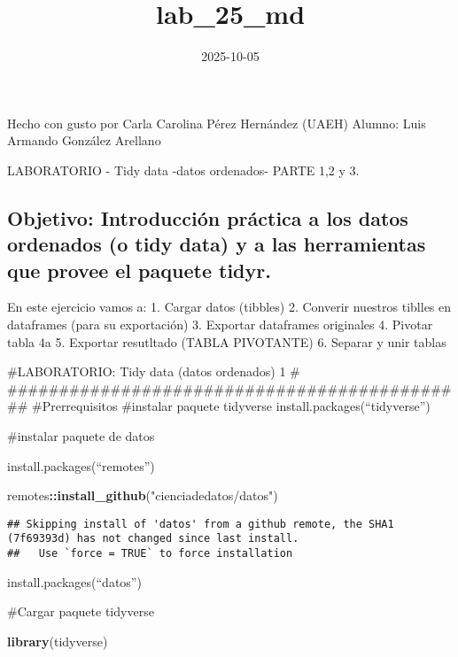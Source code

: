 \documentclass[
]{article}
\title{lab\_25\_md}
\author{}
\date{\vspace{-2.5em}2025-10-05}
\newenvironment{Shaded}{\begin{snugshade}}{\end{snugshade}}
\newcommand{\FunctionTok}[1]{\textcolor[rgb]{0.13,0.29,0.53}{\textbf{#1}}}
\newcommand{\NormalTok}[1]{#1}
\newcommand{\SpecialCharTok}[1]{\textcolor[rgb]{0.81,0.36,0.00}{\textbf{#1}}}
\newcommand{\StringTok}[1]{\textcolor[rgb]{0.31,0.60,0.02}{#1}}
\begin{document}
\maketitle

Hecho con gusto por Carla Carolina Pérez Hernández (UAEH) Alumno: Luis
Armando González Arellano

LABORATORIO - Tidy data -datos ordenados- PARTE 1,2 y 3.

\subsection{Objetivo: Introducción práctica a los datos ordenados (o
tidy data) y a las herramientas que provee el paquete
tidyr.}\label{objetivo-introducciuxf3n-pruxe1ctica-a-los-datos-ordenados-o-tidy-data-y-a-las-herramientas-que-provee-el-paquete-tidyr.}

En este ejercicio vamos a: 1. Cargar datos (tibbles) 2. Converir
nuestros tiblles en dataframes (para su exportación) 3. Exportar
dataframes originales 4. Pivotar tabla 4a 5. Exportar resutltado (TABLA
PIVOTANTE) 6. Separar y unir tablas

\#LABORATORIO: Tidy data (datos ordenados) 1 \#
\#\#\#\#\#\#\#\#\#\#\#\#\#\#\#\#\#\#\#\#\#\#\#\#\#\#\#\#\#\#\#\#\#\#\#\#\#\#\#\#\#\#\#\#\#
\#Prerrequisitos \#instalar paquete tidyverse
install.packages(``tidyverse'')

\#instalar paquete de datos

install.packages(``remotes'')

\begin{Shaded}
\begin{Highlighting}[]
\NormalTok{remotes}\SpecialCharTok{::}\FunctionTok{install\_github}\NormalTok{(}\StringTok{"cienciadedatos/datos"}\NormalTok{)}
\end{Highlighting}
\end{Shaded}

\begin{verbatim}
## Skipping install of 'datos' from a github remote, the SHA1 (7f69393d) has not changed since last install.
##   Use `force = TRUE` to force installation
\end{verbatim}

install.packages(``datos'')

\#Cargar paquete tidyverse

\begin{Shaded}
\begin{Highlighting}[]
\FunctionTok{library}\NormalTok{(tidyverse)}
\end{Highlighting}
\end{Shaded}
\end{document}
